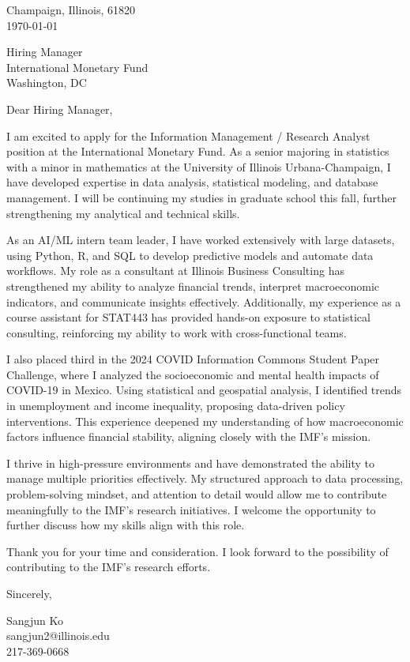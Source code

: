 \documentclass[11pt]{article}
\begin{document}
\noindent
Champaign, Illinois, 61820 \\
\today
\vspace{2em}

\noindent
Hiring Manager \\
International Monetary Fund \\
Washington, DC \\

\vspace{1.5em}

Dear Hiring Manager,

I am excited to apply for the Information Management / Research Analyst position at the International Monetary Fund. As a senior majoring in statistics with a minor in mathematics at the University of Illinois Urbana-Champaign, I have developed expertise in data analysis, statistical modeling, and database management. I will be continuing my studies in graduate school this fall, further strengthening my analytical and technical skills.

As an AI/ML intern team leader, I have worked extensively with large datasets, using Python, R, and SQL to develop predictive models and automate data workflows. My role as a consultant at Illinois Business Consulting has strengthened my ability to analyze financial trends, interpret macroeconomic indicators, and communicate insights effectively. Additionally, my experience as a course assistant for STAT443 has provided hands-on exposure to statistical consulting, reinforcing my ability to work with cross-functional teams.

I also placed third in the 2024 COVID Information Commons Student Paper Challenge, where I analyzed the socioeconomic and mental health impacts of COVID-19 in Mexico. Using statistical and geospatial analysis, I identified trends in unemployment and income inequality, proposing data-driven policy interventions. This experience deepened my understanding of how macroeconomic factors influence financial stability, aligning closely with the IMF’s mission.

I thrive in high-pressure environments and have demonstrated the ability to manage multiple priorities effectively. My structured approach to data processing, problem-solving mindset, and attention to detail would allow me to contribute meaningfully to the IMF’s research initiatives. I welcome the opportunity to further discuss how my skills align with this role.

Thank you for your time and consideration. I look forward to the possibility of contributing to the IMF’s research efforts.


\vspace{1em}

Sincerely,

\vspace{2em}

\noindent
Sangjun Ko\\
sangjun2@illinois.edu\\
217-369-0668
\end{document}

